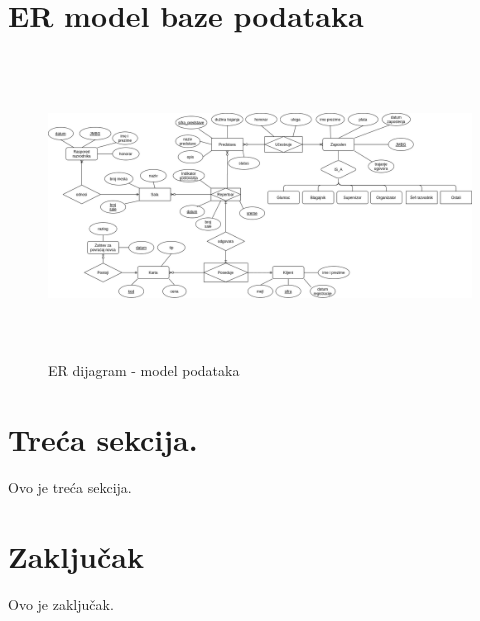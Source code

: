 \documentclass[a4paper]{article}
\begin{document}
\section{ER model baze podataka}
\begin{figure}[H]
  \begin{center}
    \includegraphics[width=140mm,height=80mm]{../database-model/model.png}
  \end{center}
  \caption{ER dijagram - model podataka}
  \label{er_diagram_model}
\end{figure}

\section{Treća sekcija.}
Ovo je treća sekcija.

\section{Zaključak}
Ovo je zaključak.

\newpage

\appendix
 

\end{document}
